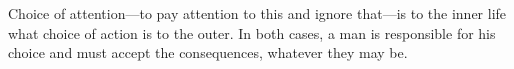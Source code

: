 \begin{savequote}[75mm]
Choice of attention---to pay attention to this and ignore that---is to the inner life what choice of action is to the outer. In both cases, a man is responsible for his choice and must accept the consequences, whatever they may be.
\end{savequote}







 

